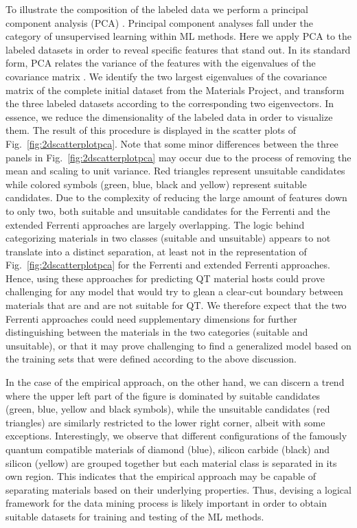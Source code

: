 \documentclass[superscriptaddress,unsortedaddress,
 amsmath,amssymb,
 aps,
]{revtex4-2}
\begin{document}
To illustrate the composition of the labeled data we perform a principal component analysis (PCA) \cite{Jolliffe2002}. Principal component analyses fall  under the category of unsupervised learning within ML  methods. Here we apply PCA to the labeled datasets in order to reveal specific features that stand out. In its standard  form, PCA relates the variance of the features with the eigenvalues of the covariance matrix \cite{Jolliffe2002,Murphy2012,Hastie2009}. We identify the two largest eigenvalues of the covariance matrix \cite{Hastie2009} of the complete initial dataset from the Materials Project, and transform the three labeled datasets according to the corresponding two eigenvectors. In essence, we reduce the dimensionality of the labeled data in order to visualize them.
The result of this procedure is displayed in the scatter plots of Fig.~\ref{fig:2dscatterplotpca}. Note that some minor differences between the three panels in Fig.~\ref{fig:2dscatterplotpca} may occur due to the process of removing the mean and scaling to unit variance. Red triangles represent unsuitable candidates while colored symbols (green, blue, black and yellow) represent suitable candidates. 
Due to the complexity of reducing the large amount of features down to only two, both suitable and unsuitable candidates for the Ferrenti and the extended Ferrenti approaches are largely overlapping. 
The logic behind categorizing materials in two classes (suitable and unsuitable) appears to not translate into a distinct separation, at least not in the representation of Fig.~\ref{fig:2dscatterplotpca} for the Ferrenti and extended Ferrenti approaches.  
Hence, using these approaches for predicting QT material hosts could prove challenging for any model that would try to glean a clear-cut boundary between materials that are and are not suitable for QT. 
We therefore expect that the two Ferrenti approaches could need supplementary dimensions for further distinguishing between the materials in the two categories (suitable and unsuitable), or that it may prove challenging to find a generalized model based on the training sets that were defined according to the above discussion. 

In the case of the empirical approach, on the other hand, we can discern a trend where the upper left part of the figure is dominated by suitable candidates (green, blue, yellow and black symbols), while the unsuitable candidates (red triangles) are similarly restricted to the lower right corner, albeit with some exceptions. 
Interestingly, we observe that different configurations of the famously quantum compatible materials of diamond (blue), silicon carbide (black) and silicon (yellow) are grouped together but each material class is separated in its own region. 
This indicates that the empirical approach may be capable of separating materials based on their underlying properties. Thus, devising a logical framework for the data mining process is likely important in order to obtain suitable datasets for training and testing of the ML methods. 
\end{document}
